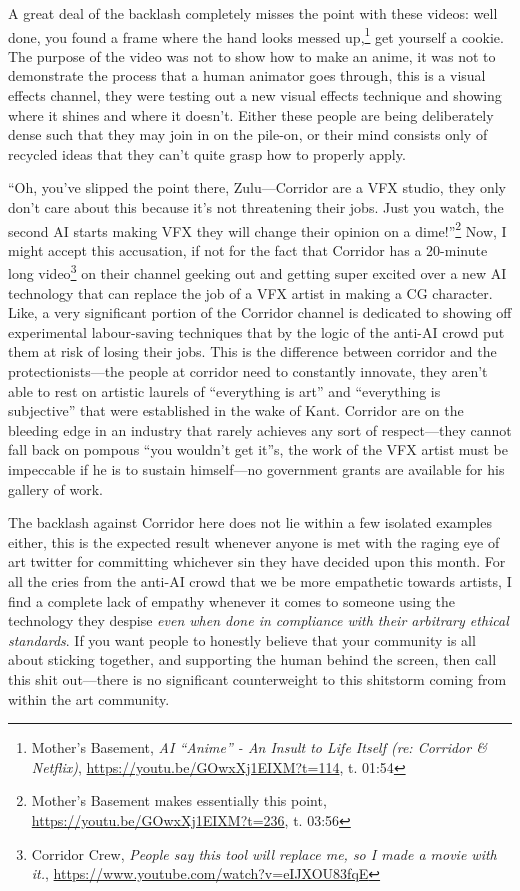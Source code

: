 \documentclass[11pt]{article}
\begin{document}
A great deal of the backlash completely misses the point with these videos: well done, you found a frame where the hand looks messed up,\footnote{Mother's Basement, \emph{AI ``Anime'' - An Insult to Life Itself (re: Corridor \& Netflix)}, \url{https://youtu.be/GOwxXj1EIXM?t=114}, t. 01:54} get yourself a cookie. The purpose of the video was not to show how to make an anime, it was not to demonstrate the process that a human animator goes through, this is a visual effects channel, they were testing out a new visual effects technique and showing where it shines and where it doesn't. Either these people are being deliberately dense such that they may join in on the pile-on, or their mind consists only of recycled ideas that they can't quite grasp how to properly apply.

``Oh, you've slipped the point there, Zulu---Corridor are a VFX studio, they only don't care about this because it's not threatening their jobs. Just you watch, the second AI starts making VFX they will change their opinion on a dime!''\footnote{Mother's Basement makes essentially this point, \url{https://youtu.be/GOwxXj1EIXM?t=236}, t. 03:56} Now, I might accept this accusation, if not for the fact that Corridor has a 20-minute long video\footnote{Corridor Crew, \emph{People say this tool will replace me, so I made a movie with it.}, \url{https://www.youtube.com/watch?v=eIJXOU83fqE}} on their channel geeking out and getting super excited over a new AI technology that can replace the job of a VFX artist in making a CG character. Like, a very significant portion of the Corridor channel is dedicated to showing off experimental labour-saving techniques that by the logic of the anti-AI crowd put them at risk of losing their jobs. This is the difference between corridor and the protectionists---the people at corridor need to constantly innovate, they aren't able to rest on artistic laurels of ``everything is art'' and ``everything is subjective'' that were established in the wake of Kant. Corridor are on the bleeding edge in an industry that rarely achieves any sort of respect---they cannot fall back on pompous ``you wouldn't get it''s, the work of the VFX artist must be impeccable if he is to sustain himself---no government grants are available for his gallery of work.

The backlash against Corridor here does not lie within a few isolated examples either, this is the expected result whenever anyone is met with the raging eye of art twitter for committing whichever sin they have decided upon this month. For all the cries from the anti-AI crowd that we be more empathetic towards artists, I find a complete lack of empathy whenever it comes to someone using the technology they despise \emph{even when done in compliance with their arbitrary ethical standards}. If you want people to honestly believe that your community is all about sticking together, and supporting the human behind the screen, then call this shit out---there is no significant counterweight to this shitstorm coming from within the art community.
\end{document}
